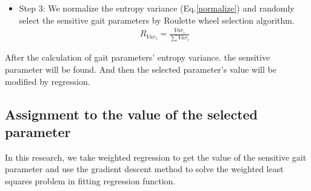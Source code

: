 \begin{itemize}
	\item Step 3: We normalize the entropy variance (Eq.\ref{normalize}) and randomly select the sensitive gait parameters by Roulette wheel selection algorithm. %
	\begin{eqnarray}\label{normalize}
	R_{Var_{i}}=\frac{Var_{i}}{\sum Var_{i}}
	\end{eqnarray}
	
\end{itemize}

After the calculation of gait parameters' entropy variance. the sensitive parameter will be found. And then the selected parameter's value will be modified by regression.


\subsection{Assignment to the value of the selected parameter}

In this research, we take weighted regression to get the value of the sensitive gait parameter and use the gradient descent method to solve the weighted least squares problem in fitting regression function.

